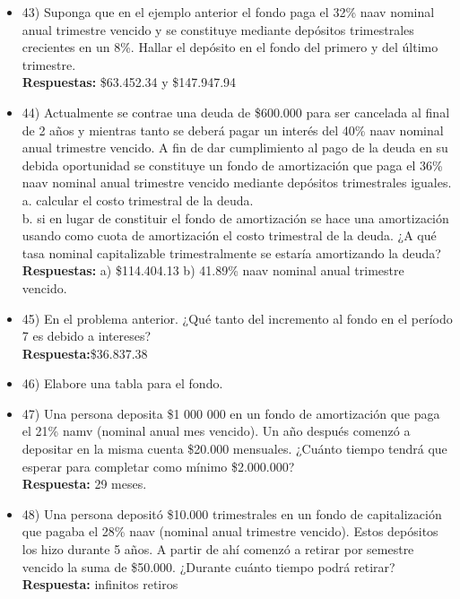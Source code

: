 \begin{itemize}
	\item 43) Suponga que en el ejemplo anterior el fondo paga el 32\% naav nominal anual trimestre vencido y se constituye mediante depósitos trimestrales crecientes en un 8\%. Hallar el depósito en el fondo del primero y del último trimestre.\\
	\textbf{Respuestas:} \$63.452.34 y \$147.947.94
	\medskip
	
	\item 44)  Actualmente se contrae una deuda de \$600.000 para ser cancelada al final de 2 años y mientras tanto se deberá pagar un interés del 40\% naav nominal anual trimestre vencido. A fin de dar cumplimiento al pago de la deuda en su debida oportunidad se constituye un fondo de amortización que paga el 36\% naav nominal anual trimestre vencido mediante depósitos trimestrales iguales. \\
	
	a.	calcular el costo trimestral de la deuda.\\
	b.	si en lugar de constituir el fondo de amortización se hace una amortización usando como cuota de amortización el costo trimestral de la deuda. ¿A qué tasa nominal capitalizable trimestralmente se estaría amortizando la deuda?\\
	\textbf{Respuestas:} a) \$114.404.13 b) 41.89\% naav nominal anual trimestre vencido.
	\medskip
	
	\item 45) En el problema anterior. ¿Qué tanto del incremento al fondo en el período 7 es debido a intereses? \\
	\textbf{Respuesta:}\$36.837.38
	\medskip
	
	\item 46) Elabore una tabla para el fondo.
	\medskip
	
	\item 47) Una persona deposita \$1 000 000 en un fondo de amortización que paga el 21\% namv (nominal anual mes vencido). Un año después comenzó a depositar en la misma cuenta \$20.000 mensuales. ¿Cuánto tiempo tendrá que esperar para completar como mínimo \$2.000.000? \\
	\textbf{Respuesta:} 29 meses.
	\medskip
	
	\item 48) Una persona depositó \$10.000 trimestrales en un fondo de capitalización que pagaba el 28\% naav (nominal anual trimestre vencido).  Estos depósitos los hizo durante 5 años. A partir de ahí comenzó a retirar por semestre vencido la suma de \$50.000. ¿Durante cuánto tiempo podrá retirar? \\
	\textbf{Respuesta:} infinitos retiros
	\medskip
	

\end{itemize}
